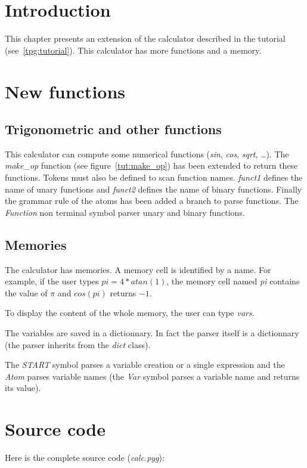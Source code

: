 \section{Introduction}

This chapter presents an extension of the calculator described in the tutorial (see~\ref{tpg:tutorial}).
This calculator has more functions and a memory.

\section{New functions}

\subsection{Trigonometric and other functions}

This calculator can compute some numerical functions (\emph{sin}, \emph{cos}, \emph{sqrt}, \ldots).
The \emph{make\_op} function (see figure~\ref{tut:make_op}) has been extended to return these functions.
Tokens must also be defined to scan function names.
\emph{funct1} defines the name of unary functions and \emph{funct2} defines the name of binary functions.
Finally the grammar rule of the atoms has been added a branch to parse functions.
The \emph{Function} non terminal symbol parser unary and binary functions.

\subsection{Memories}

The calculator has memories.
A memory cell is identified by a name.
For example, if the user types \emph{$pi = 4*atan(1)$}, the memory cell named \emph{pi} contains the value of \emph{$\pi$} and \emph{$cos(pi)$} returns \emph{$-1$}.

To display the content of the whole memory, the user can type \emph{vars}.

The variables are saved in a dictionnary.
In fact the parser itself is a dictionnary (the parser inherits from the \emph{dict} class).

The \emph{START} symbol parses a variable creation or a single expression and the \emph{Atom} parses variable names (the \emph{Var} symbol parses a variable name and returns its value).

\section{Source code}

Here is the complete source code (\emph{calc.pyg}):

